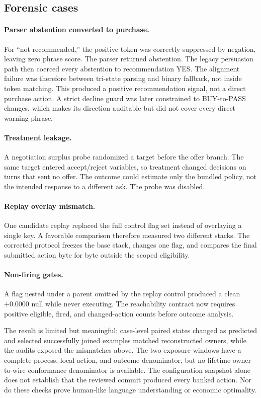 \subsection{Forensic cases}

\paragraph{Parser abstention converted to purchase.}
For ``not recommended,'' the positive token was correctly suppressed by
negation, leaving zero phrase score. The parser returned abstention. The legacy
persuasion path then coerced every abstention to recommendation YES. The
alignment failure was therefore between tri-state parsing and binary fallback,
not inside token matching. This produced a positive recommendation signal, not
a direct purchase action. A strict decline guard was later constrained to
BUY-to-PASS changes, which makes its direction auditable but did not cover every
direct-warning phrase.

\paragraph{Treatment leakage.}
A negotiation surplus probe randomized a target before the offer branch. The
same target entered accept/reject variables, so treatment changed decisions on
turns that sent no offer. The outcome could estimate only the bundled policy,
not the intended response to a different ask. The probe was disabled.

\paragraph{Replay overlay mismatch.}
One candidate replay replaced the full control flag set instead of overlaying a
single key. A favorable comparison therefore measured two different stacks.
The corrected protocol freezes the base stack, changes one flag, and compares
the final submitted action byte for byte outside the scoped eligibility.

\paragraph{Non-firing gates.}
A flag nested under a parent omitted by the replay control produced a clean
$+0.0000$ null while never executing. The reachability contract now requires
positive eligible, fired, and changed-action counts before outcome analysis.

The result is limited but meaningful: case-level paired states changed as
predicted and selected successfully joined examples matched reconstructed
owners, while the audits exposed the mismatches above. The two exposure windows
have a complete process, local-action, and outcome denominator, but no lifetime
owner-to-wire conformance denominator is available. The configuration snapshot
alone does not establish that the reviewed commit produced every banked action.
Nor do these checks prove human-like
language understanding or economic optimality.

